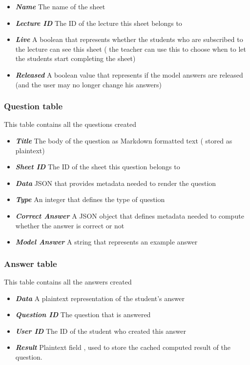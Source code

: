 \begin{itemize}
	\item  \textit{\textbf{Name}} The name of the sheet
	\item  \textit{\textbf{Lecture ID}} The ID of the lecture this sheet belongs to
	\item  \textit{\textbf{Live}} A boolean that represents whether the students who are subscribed to the lecture can see this sheet ( the teacher can use this to choose when to let the students start completing the sheet)
	\item  \textit{\textbf{Released}} A boolean value that represents if the model answers are released (and the user may no longer change his answers)
\end{itemize}

\subsubsection{Question table}
This table contains all the questions created

\begin{itemize}
	\item  \textit{\textbf{Title}} The body of the question as Markdown formatted text ( stored as plaintext)
	\item  \textit{\textbf{Sheet ID}} The ID of the sheet this question belongs to
	\item  \textit{\textbf{Data}} JSON that provides metadata needed to render the question
	\item  \textit{\textbf{Type}} An integer that defines the type of question
	\item  \textit{\textbf{Correct Answer}} A JSON object that defines metadata needed to compute whether the answer is correct or not	
	\item  \textit{\textbf{Model Answer}} A string that represents an example answer
\end{itemize}

\subsubsection{Answer table}
This table contains all the answers created

\begin{itemize}
	\item  \textit{\textbf{Data}} A plaintext representation of the student's answer
	\item  \textit{\textbf{Question ID}} The question that is answered
	\item  \textit{\textbf{User ID}} The ID of the student who created this answer
	\item  \textit{\textbf{Result}} Plaintext field , used to store the cached computed result of the question.
\end{itemize}

